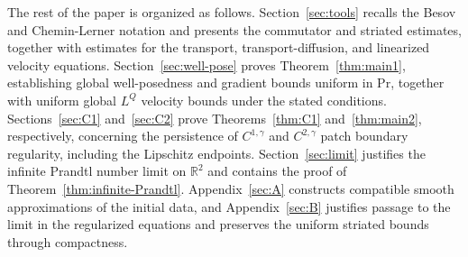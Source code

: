 \documentclass[reqno,11pt,a4paper]{amsart}
\begin{document}
The rest of the paper is organized as follows. 
Section~\ref{sec:tools} recalls the Besov and 
Chemin-Lerner notation and presents the commutator 
and striated estimates, together with estimates 
for the transport, transport-diffusion, 
and linearized velocity equations. 
Section~\ref{sec:well-pose} proves 
Theorem~\ref{thm:main1}, establishing global well-posedness 
and gradient bounds 
uniform in $\mathrm{Pr}$, together with uniform global $L^Q$ velocity bounds
under the stated conditions.
Sections~\ref{sec:C1} and~\ref{sec:C2} 
prove Theorems~\ref{thm:C1} and~\ref{thm:main2}, respectively, 
concerning the persistence of $C^{1,\gamma}$ and $C^{2,\gamma}$ 
patch boundary regularity, including the Lipschitz endpoints. 
Section~\ref{sec:limit} justifies 
the infinite Prandtl number limit on $\mathbb R^2$ 
and contains the proof of Theorem~\ref{thm:infinite-Prandtl}. 
Appendix~\ref{sec:A} constructs compatible smooth 
approximations of the initial data, 
and Appendix~\ref{sec:B} justifies passage to the limit 
in the regularized equations and preserves 
the uniform striated bounds through compactness.
\end{document}
